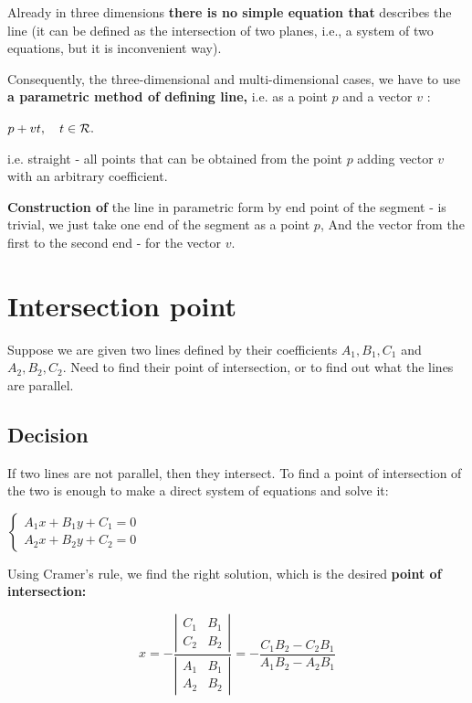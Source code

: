 Already in three dimensions \textbf{there is no simple equation that} describes the line (it can be defined as the intersection of two planes, i.e., a system of two equations, but it is inconvenient way).

Consequently, the three-dimensional and multi-dimensional cases, we have to use \textbf{a parametric method of defining line,} i.e. as a point $p$ and a vector $v$ :

$p + v t, ~ ~ ~ t \in \cal {R}.$

i.e. straight - all points that can be obtained from the point $p$ adding vector $v$ with an arbitrary coefficient.

\textbf{Construction of} the line in parametric form by end point of the segment - is trivial, we just take one end of the segment as a point $p$, And the vector from the first to the second end - for the vector $v$.

\section{ Intersection point }
Suppose we are given two lines defined by their coefficients $A_1, B_1, C_1$ and $A_2, B_2, C_2$. Need to find their point of intersection, or to find out what the lines are parallel.

\subsection{ Decision }

If two lines are not parallel, then they intersect. To find a point of intersection of the two is enough to make a direct system of equations and solve it:

$\begin{cases}
A_{1}x+B_{1}y+C_{1}=0\\
A_{2}x+B_{2}y+C_{2}=0
\end{cases}$

Using Cramer's rule, we find the right solution, which is the desired \textbf{point of intersection:}

$$ x=-\frac{\left|\begin{array}{cc}
C_{1} & B_{1}\\
C_{2} & B_{2}
\end{array}\right|}{\left|\begin{array}{cc}
A_{1} & B_{1}\\
A_{2} & B_{2}
\end{array}\right|}=-\frac{C_{1}B_{2}-C_{2}B_{1}}{A_{1}B_{2}-A_{2}B_{1}}$$

